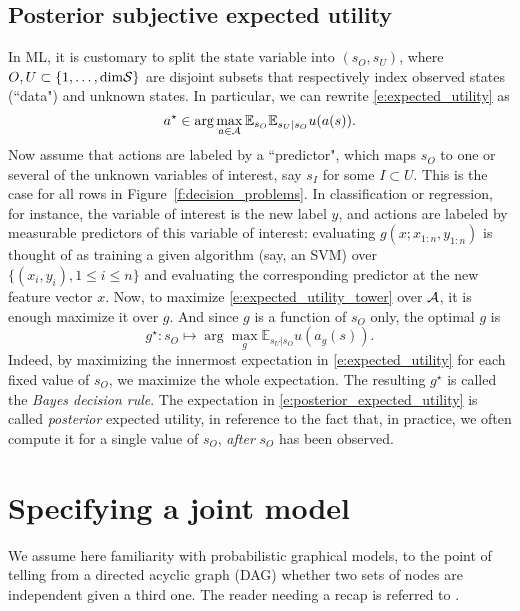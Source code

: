 \subsection{Posterior subjective expected utility}
In ML, it is customary to split the state variable into $(s_O,s_U)$, where $O, U\subset \{1,\dots,\text{dim} \mathcal{S}\}$ are disjoint subsets that respectively index observed states (``data") and unknown states. 
In particular, we can rewrite \eqref{e:expected_utility} as
\begin{equation}
    a^\star \in \arg\max_{a\in\mathcal{A}} \mathbb{E}_{s_O} \mathbb{E}_{s_U\vert s_O} u(a(s)).
    \label{e:expected_utility_tower}
\end{equation}
Now assume that actions are labeled by a ``predictor", which maps $s_O$ to one or several of the unknown variables of interest, say $s_I$ for some $I\subset U$. 
This is the case for all rows in Figure~\ref{f:decision_problems}. 
In classification or regression, for instance, the variable of interest is the new label $y$, and actions are labeled by measurable predictors of this variable of interest: evaluating $g(x; x_{1:n}, y_{1:n})$ is thought of as training a given algorithm (say, an SVM) over $\{(x_i,y_i), 1\leq i\leq n\}$ and evaluating the corresponding predictor at the new feature vector $x$.
Now, to maximize \eqref{e:expected_utility_tower} over $\mathcal{A}$, it is enough maximize it over $g$. 
And since $g$ is a function of $s_O$ only, the optimal $g$ is 
\begin{equation}
    \label{e:posterior_expected_utility}
    g^\star: s_O \mapsto \arg\max_{g} \mathbb{E}_{s_U\vert s_O} u(a_g(s)).
\end{equation}
Indeed, by maximizing the innermost expectation in \eqref{e:expected_utility} for each fixed value of $s_O$, we maximize the whole expectation. 
The resulting $g^\star$ is called the \emph{Bayes decision rule}. 
The expectation in \eqref{e:posterior_expected_utility} is called \emph{posterior} expected utility, in reference to the fact that, in practice, we often compute it for a single value of $s_O$, \emph{after} $s_O$ has been observed. 

\section{Specifying a joint model}
We assume here familiarity with probabilistic graphical models, to the point of telling from a directed acyclic graph (DAG) whether two sets of nodes are independent given a third one. 
The reader needing a recap is referred to \citep[Sections 10.1 to 10.5]{Mur12}.


